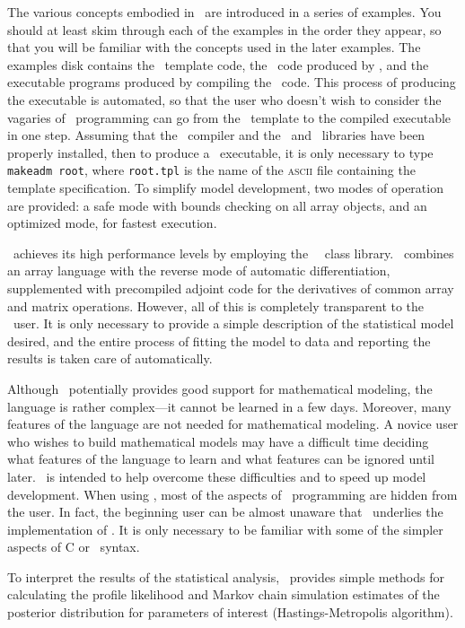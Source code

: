 \documentclass{admbmanual}
\begin{document}
The various concepts embodied in \ADM\ are introduced
in a series of examples. You should at least skim through each of
the examples in the order they appear, so that you will be
familiar with the concepts used in the later examples.
The examples disk 
contains the \ADM\ template code, the \cplus\ code produced
by \ADM, and the executable programs produced by
compiling the \cplus\ code.  This process of producing the
executable is automated, so that the user who doesn't wish to
consider the vagaries of \cplus\  programming can go from
the \ADM\ template to the compiled executable in one step.
Assuming that the \cplus\ compiler and the \ADM\ and \scAD\ libraries 
have been properly installed, then
to produce a \ADM\ executable, it is only necessary to 
type \texttt{makeadm root}, where \texttt{root.tpl} is the name of the 
\textsc{ascii} file containing the template specification. 
To simplify model development, two modes of operation are
provided: a safe mode with bounds checking on all 
array objects, and an optimized mode, for fastest execution.
 
\ADM\ achieves its high performance levels by employing
 the \scAD\ \cplus\ class library. \scAD\ combines an array language
 with the reverse mode of automatic differentiation, supplemented
with precompiled adjoint code for the derivatives of common
array and matrix operations. However, all of this is completely
transparent to the \ADM\ user. It is only necessary to
provide a simple description of the statistical 
model desired, and the entire process of fitting the model to
data and reporting the results is taken care of automatically.

Although \cplus\ potentially provides good support for 
mathematical modeling, the language is rather complex---it cannot
be learned in a few days. 
Moreover, many features of the language are not needed for mathematical
modeling.  A novice user who wishes to build mathematical
models may have a difficult time deciding what
features of the language to learn and what features can be
ignored until later. \ADM\ is
intended to help overcome these difficulties and to speed up
model development. When using \ADM, most of the aspects of
\cplus\ programming are hidden from the user. 
 In fact, the beginning
user can be almost unaware that \cplus\ underlies the implementation
of \ADM.  It is only necessary to be familiar with some of the simpler 
aspects of C or \cplus~syntax.

To interpret the results of the statistical analysis, \ADM\ provides
simple methods for calculating the profile likelihood and Markov
chain simulation estimates of the posterior distribution
for parameters of interest (Hastings-Metropolis algorithm).
\end{document}
